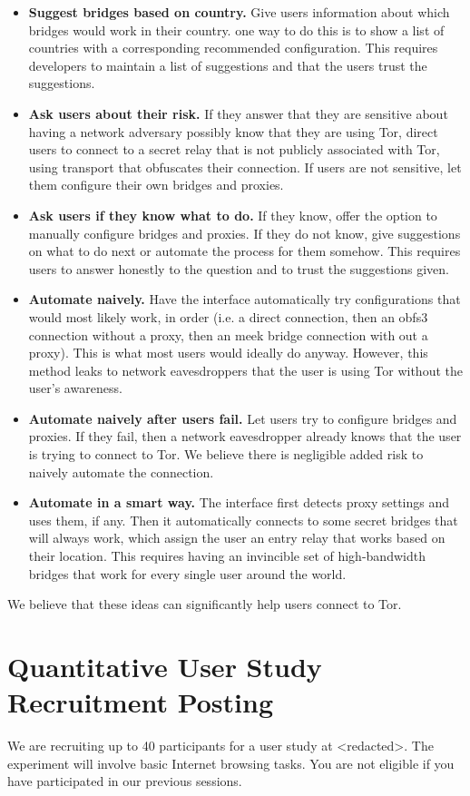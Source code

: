 \documentclass[USenglish,oneside,twocolumn]{article}
\begin{document}
{\color {red}
\begin{itemize} 
\item{\bfseries Suggest bridges based on country.} Give users information about which bridges would work in their country. one way to do this is to show a list of countries with a corresponding recommended configuration. This requires developers to maintain a list of suggestions and that the users trust the suggestions. 
\item{\bfseries Ask users about their risk.} If they answer that they are sensitive about having a network adversary possibly know that they are using Tor, direct users to connect to a secret relay that is not publicly associated with Tor, using transport that obfuscates their connection. If users are not sensitive, let them configure their own bridges and proxies. 
\item{\bfseries Ask users if they know what to do.} If they know, offer the option to manually configure bridges and proxies. If they do not know, give suggestions on what to do next or automate the process for them somehow. This requires users to answer honestly to the question and to trust the suggestions given. 
\item{\bfseries Automate naively.} Have the interface automatically try configurations that would most likely work, in order (i.e. a direct connection, then an obfs3 connection without a proxy, then an meek bridge connection with out a proxy). This is what most users would ideally do anyway. However, this method leaks to network eavesdroppers that the user is using Tor without the user's awareness. 
\item {\bfseries Automate naively after users fail.} Let users try to configure bridges and proxies. If they fail, then a network eavesdropper already knows that the user is trying to connect to Tor. We believe there is negligible added risk to naively automate the connection. 
\item{\bfseries Automate in a smart way.} The interface first detects proxy settings and uses them, if any. Then it automatically connects to some secret bridges that will always work, which assign the user an entry relay that works based on their location. This requires having an invincible set of high-bandwidth bridges that work for every single user around the world.  
\end{itemize}
We believe that these ideas can significantly help users connect to Tor.
}

\section{Quantitative User Study Recruitment Posting}
\label{quantitative-recruitment}
We are recruiting up to 40 participants for a user study at <redacted>. %
The experiment will involve basic Internet browsing tasks. You are not eligible if you have participated in our previous sessions.\\
\end{document}
